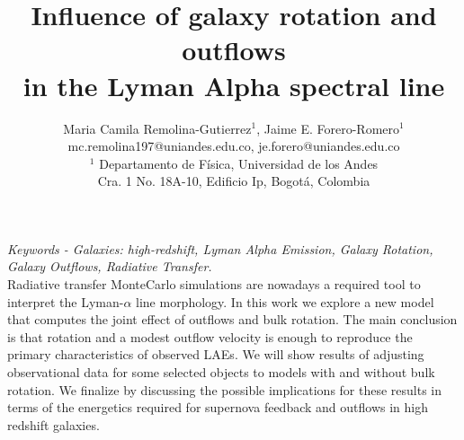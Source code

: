 \documentclass[11pt,a4paper]{article}
\begin{document}
\thispagestyle{empty}

\title{\textbf{Influence of galaxy rotation and outflows \\
			   in the Lyman Alpha spectral line}}
		
\author{Maria Camila Remolina-Gutierrez$^1$, Jaime E. Forero-Romero$^1$\\ \vspace{3mm}
	    mc.remolina197@uniandes.edu.co, \hspace{0.8mm} je.forero@uniandes.edu.co\\ 
		$^1$ Departamento de F\'{i}sica, Universidad de los Andes \\
		Cra. 1 No. 18A-10, Edificio Ip, Bogot\'a, Colombia}
\date{} %
\maketitle\thispagestyle{empty} %
\textit{Keywords - Galaxies: high-redshift, Lyman Alpha Emission, Galaxy Rotation, Galaxy Outflows, Radiative Transfer.}\\

Radiative transfer MonteCarlo simulations are nowadays a required tool
to interpret the Lyman-$\alpha$ line morphology. In this work we
explore a new model that computes the joint effect of outflows and
bulk rotation. The main conclusion is that rotation and a modest
outflow velocity is enough to reproduce the primary characteristics of
observed LAEs. 
We will show results of adjusting observational data for some selected
objects to models with and without bulk rotation. We finalize by
discussing the possible implications for these results in terms of the
energetics required for supernova feedback and outflows in high
redshift galaxies. 





\end{document}
